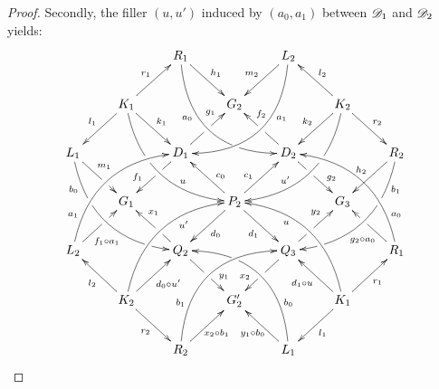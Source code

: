 \begin{proof}
	Secondly, the filler $(u,u')$ induced by $(a_0, a_1)$ between $\mathscr{D}_1$ and $\mathscr{D}_2$ yields:
	\[
	\xymatrix{&&R_1 \ar@/_1cm/[ddrr]_(.35){a_0}|(.7)\hole \ar[dr]^{h_1}&& L_2\ar@/^1cm/[ddll]^(.35){a_1}  \ar[dl]_{m_2}\\&K_1\ar[dr]^{k_1}\ar[dl]_{l_1} \ar@/_.8cm/[ddrr]|(.36)\hole^(.65){u}\ar[ur]^{r_1}&& G_2 && K_2 \ar@/^.8cm/[ddll]|(.36)\hole_(.65){u'}\ar[dl]_{k_2}\ar[lu]_{l_2} \ar[dr]^{r_2}\\L_1 \ar@/_.8cm/[ddrr]_(.2){b_0}|(.31)\hole|(.81)\hole \ar[dr]^(.4){m_1}|(.61)\hole && D_1 \ar[dl]|(.4)\hole_(.65){f_1}\ar[ur]|(.5)\hole^(.7){g_1}&&D_2 \ar[dr]|(.4)\hole^(.65){g_2} \ar[ul]|(.5)\hole_(.65){f_2}&&R_2\ar@/^.8cm/[ddll]^(.2){b_1}|(.31)\hole|(.81)\hole\ar[dl]_{h_2}\\&G_1 &&P_2\ar[dr]_{d_1} \ar[dl]^{d_0}\ar[ur]^(.4){c_1}\ar[ul]_(.4){c_0}&&G_3\\L_2 \ar@/^.8cm/[uurr]^(.2){a_1} \ar[ur]_(.35){f_1\circ a_1}|(.61)\hole&&Q_2 \ar[ul]|(.4)\hole_(.65){x_1}\ar[dr]|(.5)\hole^(.65){y_1} &&Q_3\ar[ur]|(.4)\hole^(.65){y_2} \ar[dl]|(.5)\hole_(.65){x_2} && R_1  \ar[ul]^(.35){g_2\circ a_0}|(.61)\hole\ar@/_.8cm/[uull]_(.2){a_0}\\&K_2 \ar[ur]_{d_0\circ u'} \ar[dr]_{r_2} \ar[ul]^{l_2}\ar@/^.8cm/[uurr]_(.65){u'}&&G'_2&& K_1 \ar[ur]_{r_1} \ar[ul]^{d_1\circ u} \ar[dl]^{l_1} \ar@/_.8cm/[uull]^(.65){u}\\&& R_2 \ar[ur]_{\hspace{-5pt}x_2\circ b_1}\ar@/^1cm/[uurr]^(.25){b_1}&& L_1 \ar[ul]^{y_1\circ b_0\hspace{-5pt}} \ar@/_1cm/[uull]_(.25){b_0} |(.69)\hole }\]



\end{proof}
